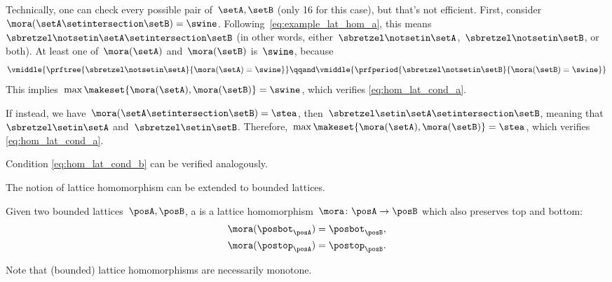 \begin{example}
    Technically, one can check every possible pair of~$\setA,\setB$ (only 16 for this case), but that's not efficient.
    First, consider~$\mora(\setA\setintersection \setB)=\swine$.
    Following~\cref{eq:example_lat_hom_a}, this means~$\sbretzel \notsetin \setA\setintersection \setB$ (in other words, either~$\sbretzel \notsetin \setA$,~$\sbretzel \notsetin \setB$, or both).
    At least one of~$\mora(\setA)$ and~$\mora(\setB)$ is~$\swine$, because
    \begin{equation}
        \vmiddle{
            \prftree{
                \sbretzel \notsetin \setA
            }{
                \mora(\setA) = \swine
            }
        }
        \qqand
        \vmiddle{
            \prfperiod{
                \sbretzel \notsetin \setB
            }{
                \mora(\setB) = \swine
            }
        }
    \end{equation}
    This implies~$\max\makeset{\mora(\setA),\mora(\setB)}=\swine$, which verifies \cref{eq:hom_lat_cond_a}.

    If instead, we have~$\mora(\setA\setintersection \setB)=\stea$, then~$\sbretzel \setin \setA\setintersection \setB$, meaning that~$\sbretzel \setin \setA$ and~$\sbretzel \setin \setB$.
    Therefore,~$\max\makeset{ \mora(\setA),\mora(\setB)}=\stea$, which verifies \cref{eq:hom_lat_cond_a}.

    Condition \cref{eq:hom_lat_cond_b} can be verified analogously.
\end{example}

The notion of lattice homomorphism can be extended to bounded lattices.

\begin{ctdefinition}
    \label{def:bounded_lat_homomorphism}
    Given two bounded lattices~$\posA,\posB$, a \emph{} is a lattice homomorphism~$\mora\colon \posA\to \posB$ which also preserves top and bottom:
    \begin{equation}
        \begin{aligned}
            \mora(\posbot_\posA) & =\posbot_\posB, \\
            \mora(\postop_\posA) & =\postop_\posB.
        \end{aligned}
    \end{equation}
\end{ctdefinition}

Note that (bounded) lattice homomorphisms are necessarily monotone.


